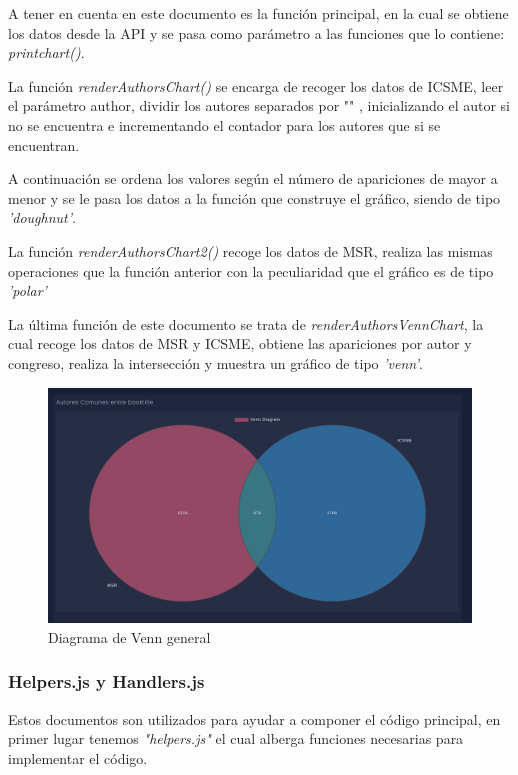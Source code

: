 \documentclass[a4paper, 12pt]{book}
\begin{document}
A tener en cuenta en este documento es la función principal, en la cual se obtiene los datos desde la API y se pasa como parámetro a las funciones que lo contiene: \textit{printchart()}.

La función \textit{renderAuthorsChart()} se encarga de recoger los datos de ICSME, leer el parámetro author, dividir los autores separados por "\textbar" , inicializando el autor si no se encuentra e incrementando el contador para los autores que si se encuentran.

A continuación se ordena los valores según el número de apariciones de mayor a menor y se le pasa los datos a la función que construye el gráfico, siendo de tipo \textit{'doughnut'}.


La función \textit{renderAuthorsChart2()} recoge los datos de MSR, realiza las mismas operaciones que la función anterior con la peculiaridad que el gráfico es de tipo \textit{'polar'}


La última función de este documento se trata de \textit{renderAuthorsVennChart}, la cual recoge los datos de MSR y ICSME, obtiene las apariciones por autor y congreso, realiza la intersección y muestra un gráfico de tipo \textit{'venn'}.

\begin{figure}[h]
  \centering
  \includegraphics[width=15cm, keepaspectratio]{img/venn_graph_T.png}
  \caption{Diagrama de Venn general}
  \label{fig:venn_graph_t}
\end{figure}

\subsubsection{Helpers.js y Handlers.js}

Estos documentos son utilizados para ayudar a componer el código principal, en primer lugar tenemos \textit{"helpers.js"} el cual alberga funciones necesarias para implementar el código.
\end{document}
